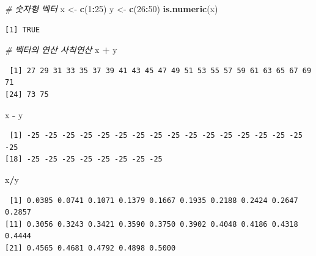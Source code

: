 \documentclass[11pt,a4paper]{book}
\newenvironment{Shaded}{\begin{snugshade}}{\end{snugshade}}
\newcommand{\KeywordTok}[1]{\textcolor[rgb]{0.13,0.29,0.53}{\textbf{#1}}}
\newcommand{\DecValTok}[1]{\textcolor[rgb]{0.00,0.00,0.81}{#1}}
\newcommand{\StringTok}[1]{\textcolor[rgb]{0.31,0.60,0.02}{#1}}
\newcommand{\CommentTok}[1]{\textcolor[rgb]{0.56,0.35,0.01}{\textit{#1}}}
\newcommand{\OperatorTok}[1]{\textcolor[rgb]{0.81,0.36,0.00}{\textbf{#1}}}
\newcommand{\NormalTok}[1]{#1}
\theoremstyle{definition}
\theoremstyle{definition}
\theoremstyle{definition}
\theoremstyle{remark}
\begin{document}
\footnotesize

\begin{Shaded}
\begin{Highlighting}[]
\CommentTok{# 숫자형 벡터}
\NormalTok{x <-}\StringTok{ }\KeywordTok{c}\NormalTok{(}\DecValTok{1}\OperatorTok{:}\DecValTok{25}\NormalTok{)}
\NormalTok{y <-}\StringTok{ }\KeywordTok{c}\NormalTok{(}\DecValTok{26}\OperatorTok{:}\DecValTok{50}\NormalTok{)}
\KeywordTok{is.numeric}\NormalTok{(x)}
\end{Highlighting}
\end{Shaded}

\begin{verbatim}
[1] TRUE
\end{verbatim}

\begin{Shaded}
\begin{Highlighting}[]
\CommentTok{# 벡터의 연산 사칙연산}
\NormalTok{x }\OperatorTok{+}\StringTok{ }\NormalTok{y}
\end{Highlighting}
\end{Shaded}

\begin{verbatim}
 [1] 27 29 31 33 35 37 39 41 43 45 47 49 51 53 55 57 59 61 63 65 67 69 71
[24] 73 75
\end{verbatim}

\begin{Shaded}
\begin{Highlighting}[]
\NormalTok{x }\OperatorTok{-}\StringTok{ }\NormalTok{y}
\end{Highlighting}
\end{Shaded}

\begin{verbatim}
 [1] -25 -25 -25 -25 -25 -25 -25 -25 -25 -25 -25 -25 -25 -25 -25 -25 -25
[18] -25 -25 -25 -25 -25 -25 -25 -25
\end{verbatim}

\begin{Shaded}
\begin{Highlighting}[]
\NormalTok{x}\OperatorTok{/}\NormalTok{y}
\end{Highlighting}
\end{Shaded}

\begin{verbatim}
 [1] 0.0385 0.0741 0.1071 0.1379 0.1667 0.1935 0.2188 0.2424 0.2647 0.2857
[11] 0.3056 0.3243 0.3421 0.3590 0.3750 0.3902 0.4048 0.4186 0.4318 0.4444
[21] 0.4565 0.4681 0.4792 0.4898 0.5000
\end{verbatim}
\end{document}

